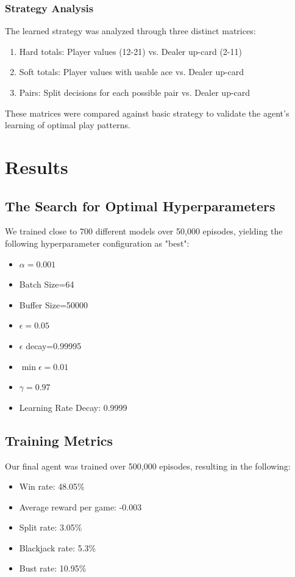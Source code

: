 \documentclass[10pt]{article}
\theoremstyle{definition}
\begin{document}
\subsubsection{Strategy Analysis}
The learned strategy was analyzed through three distinct matrices:
\begin{enumerate}
    \item Hard totals: Player values (12-21) vs. Dealer up-card (2-11)
    \item Soft totals: Player values with usable ace vs. Dealer up-card
    \item Pairs: Split decisions for each possible pair vs. Dealer up-card
\end{enumerate}
These matrices were compared against basic strategy to validate the agent's learning of optimal play patterns.
\section{Results}
\subsection{The Search for Optimal Hyperparameters}
We trained close to 700 different models over 50,000 episodes, yielding the following hyperparameter configuration as "best":
\begin{itemize}
    \item \(\alpha=0.001\)
    \item Batch Size=64
    \item Buffer Size=50000
    \item \(\epsilon=0.05\)
    \item \(\epsilon\) decay=0.99995
    \item \(\min\epsilon=0.01\)
    \item \(\gamma=0.97\)
    \item Learning Rate Decay: 0.9999
\end{itemize}
\subsection{Training Metrics}
Our final agent was trained over 500,000 episodes, resulting in the following:
\begin{itemize}
    \item Win rate: 48.05\% 
    \item Average reward per game: -0.003
    \item Split rate: 3.05\%
    \item Blackjack rate: 5.3\%
    \item Bust rate: 10.95\%
\end{itemize}
\end{document}
